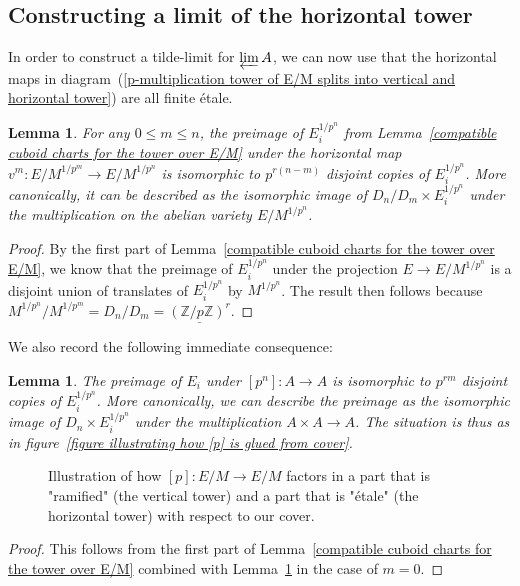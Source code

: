 \documentclass[11pt,oneside]{amsart}
\newtheorem{lemma}[theorem]{Lemma}
\theoremstyle{definition}
\theoremstyle{remark}
\begin{document}
	\subsection{Constructing a limit of the horizontal tower}
	In order to construct a tilde-limit for $\varprojlim A$, we can now use that the horizontal maps in diagram~(\ref{p-multiplication tower of E/M splits into vertical and horizontal tower}) are all finite \'etale.
	\begin{lemma}\label{horizontal map is covering map}
		For any $0\leq m\leq n$, the preimage of $E_i^{1/p^n}$ from Lemma~\ref{compatible cuboid charts for the tower over E/M} under the horizontal map $v^m:E/M^{1/p^{m}}\rightarrow E/M^{1/p^n}$ is isomorphic to $p^{r(n-m)}$ disjoint copies of $E_i^{1/p^n}$. More canonically, it can be described as the isomorphic image of $D_n/D_{m}\times E_i^{1/p^n}$ under the multiplication on the abelian variety $E/M^{1/p^n}$.
	\end{lemma}
	\begin{proof}
		By the first part of Lemma~\ref{compatible cuboid charts for the tower over E/M}, we know that the preimage of $E_i^{1/p^n}$ under the projection $E\rightarrow E/M^{1/p^n}$ is a disjoint union of translates of $E_i^{1/p^n}$ by $M^{1/p^{n}}$. The result then follows because $M^{1/p^{n}}/M^{1/p^{m}} = D_n/D_m =  \underline{(\mathbb Z/p\mathbb Z)^r}$.
	\end{proof}
	We also record the following immediate consequence:
	
	\begin{lemma}\label{preimage of E_i under p^n is disjoint copies}
		The preimage of $E_i$ under $[p^n]:A\rightarrow A$ is isomorphic to $p^{rm}$ disjoint copies of $E_i^{1/p^n}$. More canonically, we can describe the preimage as the isomorphic image of  $D_n \times E_i^{1/p^n}$ under the multiplication $A\times A\rightarrow A$. The situation is thus as in figure~\ref{figure illustrating how [p] is glued from cover}.
	\end{lemma}
	\begin{figure}
		
		\caption{Illustration of how $[p]:E/M\rightarrow E/M$ factors in a part that is "ramified" (the vertical tower) and a part that is "\'etale" (the horizontal tower) with respect to our cover.}
		\label{local-glueing-[p]-tikzpicture}
	\end{figure}
	\begin{proof}
		This follows from the first part of Lemma~\ref{compatible cuboid charts for the tower over E/M} combined with Lemma~\ref{horizontal map is covering map} in the case of $m=0$.
	\end{proof}
	
\end{document}
